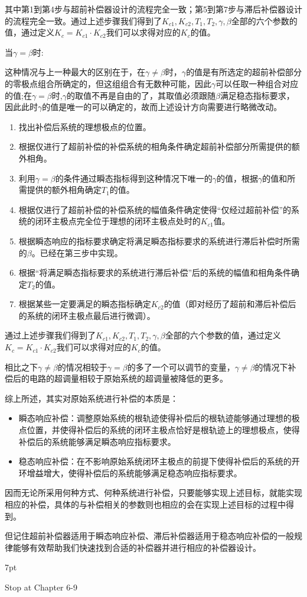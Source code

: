 \documentclass{article}
\numberwithin{equation}{section}
\numberwithin{figure}{section}
\newenvironment{formal}{%
\def\FrameCommand{%
\hspace{1pt}%
{\color{DarkBlue}\vrule width 2pt}%
{\color{formalshade}\vrule width 4pt}%
\colorbox{formalshade}%
}%
\MakeFramed{\advance\hsize-\width\FrameRestore}%
\noindent\hspace{-4.55pt}%
\begin{adjustwidth}{}{7pt}%
\vspace{2pt}\vspace{2pt}%
}
{%
\vspace{2pt}\end{adjustwidth}\endMakeFramed%
}
\begin{document}
其中第1到第4步与超前补偿器设计的流程完全一致；第5到第7步与滞后补偿器设计的流程完全一致。通过上述步骤我们得到了$K_{c1},K_{c2},T_1,T_2,\gamma,\beta$全部的六个参数的值，通过定义$K_c=K_{c1}·K_{c2}$我们可以求得对应的$K_c$的值。

当$\gamma=\beta$时:

这种情况与上一种最大的区别在于，在$\gamma\neq\beta$时，$\gamma$的值是有所选定的超前补偿部分的零极点组合所确定的，但这组组合有无数种可能，因此$\gamma$可以任取一种组合对应的值;在$\gamma=\beta$时,$\gamma$的取值不再是自由的了，其取值必须跟随$\beta$满足稳态指标要求，因此此时$\gamma$的值是唯一的可以确定的，故而上述设计方向需要进行略微改动。
\begin{enumerate}
    \item 找出补偿后系统的理想极点的位置。
    \item 根据仅进行了超前补偿的补偿系统的相角条件确定超前补偿部分所需提供的额外相角。
    \item 利用$\gamma=\beta$的条件通过瞬态指标得到这种情况下唯一的$\gamma$的值，根据$\gamma$的值和所需提供的额外相角确定$T_1$的值。
    \item 根据仅进行了超前补偿的补偿系统的幅值条件确定使得“仅经过超前补偿”的系统的闭环主极点完全位于理想的闭环主极点处时的$K_{c1}$值。
    \item 根据瞬态响应的指标要求确定将满足瞬态指标要求的系统进行滞后补偿时所需的$\beta$。已经在第三步中实现。
    \item 根据“将满足瞬态指标要求的系统进行滞后补偿”后的系统的幅值和相角条件确定$T_2$的值。
    \item 根据某些一定要满足的瞬态指标确定$K_{c2}$的值（即对经历了超前和滞后补偿后的系统的闭环主极点最后进行微调）。
\end{enumerate}

通过上述步骤我们得到了$K_{c1},K_{c2},T_1,T_2,\gamma,\beta$全部的六个参数的值，通过定义$K_c=K_{c1}·K_{c2}$我们可以求得对应的$K_c$的值。

相比之下$\gamma\neq\beta$的情况相较于$\gamma=\beta$的多了一个可以调节的变量，$\gamma\neq\beta$的情况下补偿后的电路的超调量相较于原始系统的超调量被降低的更多。

综上所述，其实对原始系统进行补偿的本质是：
\begin{itemize}
    \item 瞬态响应补偿：调整原始系统的根轨迹使得补偿后的根轨迹能够通过理想的极点位置，并使得补偿后的系统的闭环主极点恰好是根轨迹上的理想极点，使得补偿后的系统能够满足瞬态响应指标要求。
    \item 稳态响应补偿：在不影响原始系统闭环主极点的前提下使得补偿后的系统的开环增益增大，使得补偿后的系统能够满足稳态响应指标要求。
\end{itemize}

因而无论所采用何种方式、何种系统进行补偿，只要能够实现上述目标，就能实现相应的补偿，具体的与补偿相关的参数则也相应的会在实现上述目标的过程中得到。

但记住超前补偿器适用于瞬态响应补偿、滞后补偿器适用于稳态响应补偿的一般规律能够有效帮助我们快速找到合适的补偿器并进行相应的补偿器设计。


\begin{formal}
    Stop at Chapter 6-9
\end{formal}
\end{document}

